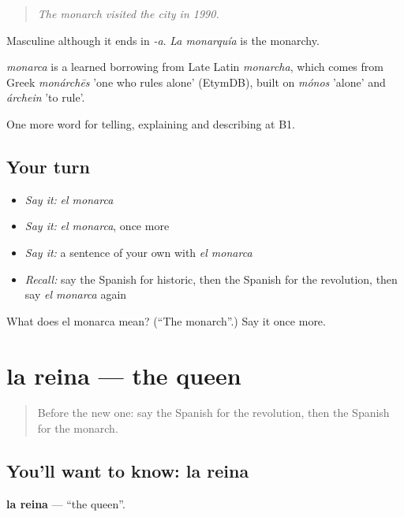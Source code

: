 \begin{quote}
\emph{The monarch visited the city in 1990.}
\end{quote}

Masculine although it ends in \emph{-a}. \emph{La monarquía} is the monarchy.

\begin{cousinweb}
\emph{monarca} is a learned borrowing from Late Latin \emph{monarcha}, which comes from Greek \emph{monárchēs} 'one who rules alone' (EtymDB), built on \emph{mónos} 'alone' and \emph{árchein} 'to rule'.
\end{cousinweb}

\begin{grammarlens}[title={What you've built}]
One more word for telling, explaining and describing at B1.
\end{grammarlens}

\subsection*{Your turn}
\begin{itemize}
\raggedright
  \item \emph{Say it:} \emph{el monarca}
  \item \emph{Say it:} \emph{el monarca}, once more
  \item \emph{Say it:} a sentence of your own with \emph{el monarca}
  \item \emph{Recall:} say the Spanish for historic, then the Spanish for the revolution, then say \emph{el monarca} again
\end{itemize}

\begin{tcolorbox}[breakable,colback=teal!4,colframe=teal!35!black,title={Before you move on}]
What does el monarca mean? (\textquotedblleft{}The monarch\textquotedblright{}.) Say it once more.
\end{tcolorbox}
\section[la reina]{la reina — the queen}

\label{lesson:ES-C568-reina}



\begin{quote}
Before the new one: say the Spanish for the revolution, then the Spanish for the monarch.
\end{quote}

\subsection*{You'll want to know: la reina}
\textbf{la reina} — \textquotedblleft{}the queen\textquotedblright{}.

